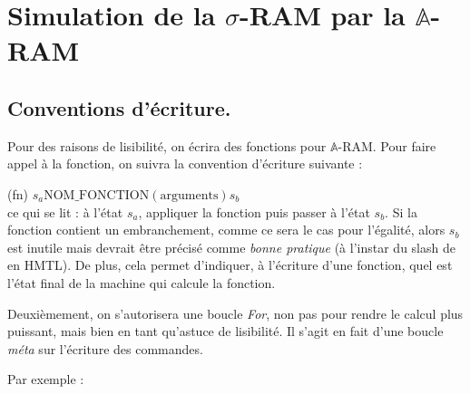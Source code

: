 \documentclass{report}
\newcommand{\bbA}{\mathbb{A}}
\begin{document}
			
			
			
			
			
			
			
			
			
			
			
			
			
			
			
			
			
		
			\begin{appendices}
				\label{appendices}
				
				\section{Simulation de la $\sigma$-RAM par la $\bbA$-RAM}
					\label{sec:annexes_programmes}
					
					\subsection{Conventions d'écriture.}
					\label{subsec:conventions_ecriture}
					Pour des raisons de lisibilité, on écrira des fonctions pour $\bbA$-RAM. Pour faire appel à la fonction, on suivra la convention d'écriture suivante : 
					
					(fn) 	$s_a \text{NOM\_FONCTION} (\text{arguments})s_b$\\
					ce qui se lit : à l'état $s_a$, appliquer la fonction puis passer à l'état $s_b$. Si la fonction contient un embranchement, comme ce sera le cas pour l'égalité, alors $s_b$ est inutile mais devrait être précisé comme \emph{bonne pratique} (à l'instar du slash de  en HMTL). De plus, cela permet d'indiquer, à l'écriture d'une fonction, quel est l'état final de la machine qui calcule la fonction.
					
					Deuxièmement, on s'autorisera une boucle \emph{For}, non pas pour rendre le calcul plus puissant, mais bien en tant qu'astuce de lisibilité. Il s'agit en fait d'une boucle \emph{méta} sur l'écriture des commandes.
					
					Par exemple :
					
					\espace
					

\end{appendices}
\end{document}
